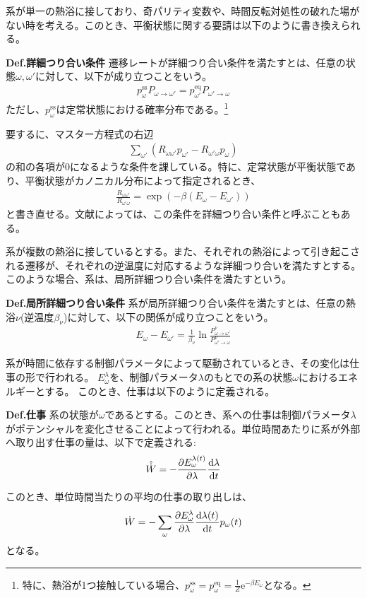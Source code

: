\documentclass[a4paper,11pt]{jsarticle}
\numberwithin{equation}{section}
\begin{document}
系が単一の熱浴に接しており、奇パリティ変数や、時間反転対処性の破れた場がない時を考える。このとき、平衡状態に関する要請は以下のように書き換えられる。
\begin{itembox}[l]{\textbf{Def.詳細つり合い条件}}
    遷移レートが詳細つり合い条件を満たすとは、任意の状態$\omega,\omega'$に対して、以下が成り立つことをいう。
    \begin{align}
      p_{\omega}^{\text{ss}} P_{\omega \to \omega'} = p_{\omega'}^{\text{eq}} P_{\omega' \to \omega}
    \end{align}
    ただし、$p_{\omega}^{\text{ss}}$は定常状態における確率分布である。\footnote{
      特に、熱浴が1つ接触している場合、$p_{\omega}^{\text{ss}} = p_{\omega}^{\text{eq}}=\frac{1}{Z} \mathrm{e}^{-\beta E_{\omega}}$となる。
    }
\end{itembox}
要するに、マスター方程式の右辺
\begin{align}
  \sum_{\omega'} (R_{\omega \omega'} p_{\omega'} - R_{\omega' \omega} p_{\omega}) 
\end{align}
の和の各項が0になるような条件を課している。特に、定常状態が平衡状態であり、平衡状態がカノニカル分布によって指定されるとき、
\begin{align}
  \frac{R_{\omega \omega'}}{R_{\omega' \omega}} = \exp(-\beta (E_{\omega} - E_{\omega'}))
\end{align}
と書き直せる。文献によっては、この条件を詳細つり合い条件と呼ぶこともある。

系が複数の熱浴に接しているとする。また、それぞれの熱浴によって引き起こされる遷移が、それぞれの逆温度に対応するような詳細つり合いを満たすとする。
このような場合、系は、局所詳細つり合い条件を満たすという。
\begin{itembox}[l]{\textbf{Def.局所詳細つり合い条件}}
    系が局所詳細つり合い条件を満たすとは、任意の熱浴$\nu$(逆温度$\beta_{\nu}$)に対して、以下の関係が成り立つことをいう。
    \begin{align}
      E_{\omega} - E_{\omega'} = \frac{1}{\beta_{\nu}} \ln \frac{P_{\omega \to \omega'}^{\nu}}{P_{\omega' \to \omega}^{\nu}}
    \end{align}
\end{itembox}


系が時間に依存する制御パラメータによって駆動されているとき、その変化は仕事の形で行われる。
$E_{\omega}^{\lambda}$を、制御パラメータ$\lambda$のもとでの系の状態$\omega$におけるエネルギーとする。
このとき、仕事は以下のように定義される。
  \begin{itembox}[l]{\textbf{Def.仕事}}
    系の状態が$\omega$であるとする。このとき、系への仕事は制御パラメータ$\lambda$がポテンシャルを変化させることによって行われる。単位時間あたりに系が外部へ取り出す仕事の量は、以下で定義される:
    \begin{align}
      \hat{\dot{W}} = -\pdv{E^{\lambda(t)}_{\omega}}{\lambda}\dv{\lambda}{t}
    \end{align}
  \end{itembox}
このとき、単位時間当たりの平均の仕事の取り出しは、
    \begin{align}
        \dot{W} = -\sum_{\omega} \pdv{E^{\lambda}_{\omega}}{\lambda}\dv{\lambda(t)}{t} p_{\omega}(t)
    \end{align}
    となる。
\end{document}
